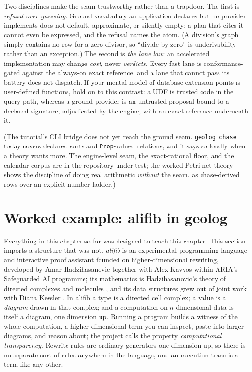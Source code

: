 Two disciplines make the seam trustworthy rather than a trapdoor. The
first is \emph{refusal over guessing}. Ground vocabulary an
application declares but no provider implements does not default,
approximate, or silently empty; a plan that cites it cannot even be
expressed, and the refusal names the atom. (A division's graph simply
contains no row for a zero divisor, so ``divide by zero'' is
underivability rather than an exception.) The second is \emph{the lane
law}: an accelerated implementation may change \emph{cost}, never
\emph{verdicts}. Every fast lane is conformance-gated against the
always-on exact reference, and a lane that cannot pass its battery
does not dispatch. If your mental model of database extension points
is user-defined functions, hold on to this contrast: a UDF is trusted
code in the query path, whereas a ground provider is an untrusted
proposal bound to a declared signature, adjudicated by the engine,
with an exact reference underneath it.

(The tutorial's CLI bridge does not yet reach the ground seam.
\texttt{geolog chase} today covers declared sorts and
\texttt{Prop}-valued relations, and it says so loudly when a theory
wants more. The engine-level seam, the exact-rational floor, and the
calendar corpus are in the repository under test; the worked
Petri-net theory shows the discipline of doing real arithmetic
\emph{without} the seam, as chase-derived rows over an explicit number
ladder.)

\section{Worked example: alifib in geolog}
\label{sec:gt-alifib}

Everything in this chapter so far was designed to teach this chapter.
This section imports a structure that was not. \emph{alifib}
\cite{alifib} is an experimental programming language and interactive
proof assistant founded on higher-dimensional rewriting, developed by
Amar Hadzihasanovic together with Alex Kavvos within ARIA's
Safeguarded AI programme; its mathematics is Hadzihasanovic's theory
of directed complexes and molecules \cite{hadzihasanovic24a}, and its
data structures grew out of joint work with Diana Kessler
\cite{hadzihasanovic23}. In alifib a type is a directed cell complex;
a value is a \emph{diagram} drawn in that complex; and a computation
on $n$-dimensional data is itself a diagram, one dimension up.
Running a program builds a witness of the whole computation, a
higher-dimensional term you can inspect, paste into larger diagrams,
and reason about; the project calls the property \emph{computational
transparency}. Rewrite rules are ordinary generators one dimension up,
so there is no separate sort of rules anywhere in the language, and an
execution trace is a term like any other.

